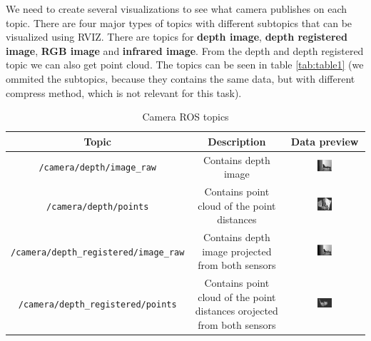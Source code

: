 \documentclass[11pt]{article}
\begin{document}
We need to create several visualizations to see what camera publishes on each topic. There are four major types of topics with different subtopics that can be visualized using RVIZ. There are topics for \textbf{depth image}, \textbf{depth registered image}, \textbf{RGB image} and \textbf{infrared image}. From the depth and depth registered topic we can also get point cloud. The topics can be seen in table \vref{tab:table1} (we ommited the subtopics, because they contains the same data, but with different compress method, which is not relevant for this task). \par
\begin{table}[h!]
  
  \begin{center}
    \caption{Camera ROS topics}
    \label{tab:table1}
    \begin{tabular}{ccc}
      \toprule
      Topic & Description & Data preview\\
      \midrule
      \texttt{/camera/depth/image_raw} &
      Contains depth image & 
      \includegraphics[width=0.2\textwidth]{figures/depth-image-raw.png}\\
      
      \texttt{/camera/depth/points} &
      Contains point cloud of the point distances & 
      \includegraphics[width=0.2\textwidth]{figures/depth-image-raw-pointcloud.png}\\
      
      \texttt{/camera/depth_registered/image_raw} &
      Contains depth image projected from both sensors& 
      \includegraphics[width=0.2\textwidth]{figures/depth_registered-image-raw.png}\\
      
      \texttt{/camera/depth_registered/points} &
      Contains point cloud of the point distances orojected from both sensors & 
      \includegraphics[width=0.2\textwidth]{figures/depth_registered-image-raw-pointcloud.png}\\
      

\end{tabular}
\end{center}
\end{table}
\end{document}
